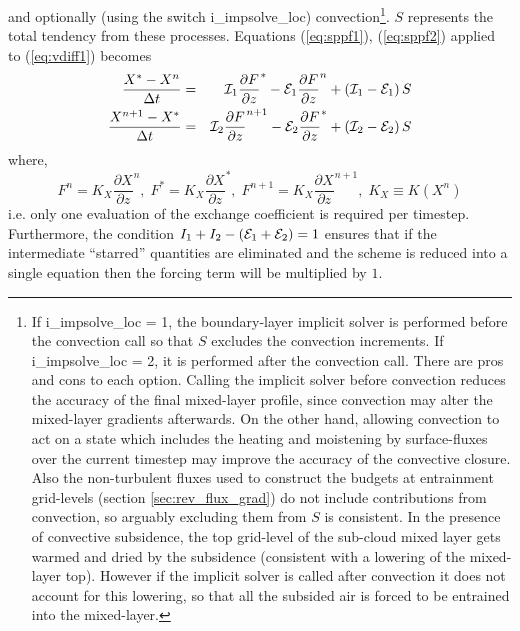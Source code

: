 \documentclass{UMDP_article}
\begin{document}
and optionally (using the switch i\_impsolve\_loc) convection\footnote{If 
i\_impsolve\_loc = 1, the boundary-layer implicit solver is
performed before the convection call so that $S$ excludes the convection
increments.  If i\_impsolve\_loc = 2, it is performed after the convection
call.  There are pros and cons to each option.  Calling the implicit solver
before convection reduces the accuracy of the final mixed-layer profile,
since convection may alter the mixed-layer gradients afterwards.
On the other hand, allowing convection to act on a state which includes
the heating and moistening by surface-fluxes over the current timestep
may improve the accuracy of the convective closure.
Also the non-turbulent fluxes used to construct the budgets at entrainment
grid-levels (section \ref{sec:rev_flux_grad}) do not include contributions
from convection, so arguably excluding them from $S$ is consistent.
In the presence of convective subsidence, the top grid-level of the
sub-cloud mixed layer gets warmed and dried by the subsidence
(consistent with a lowering of the mixed-layer top).  However if the
implicit solver is called after convection it does not account for this
lowering, so that all the subsided air is forced to be entrained into the
mixed-layer.}.  $S$ represents the total tendency from these processes.
Equations (\ref{eq:sppf1}), (\ref{eq:sppf2}) applied to
(\ref{eq:vdiff1}) becomes
\begin{eqnarray}
  \frac{X^{*}-X^{n}}{\Delta t} & = & {\cal I}_{1}\frac{\partial F}{\partial z}^{*}-{\cal E}_{1}\frac{\partial F}{\partial z}^{n}+\left({\cal I}_{1}-{\cal E}_{1}\right)S\label{eq:sppf_bl1}\\
  \frac{X^{n+1}-X^{*}}{\Delta t} & = & {\cal I}_{2}\frac{\partial
    F}{\partial z}^{n+1}-{\cal E}_{2}\frac{\partial F}{\partial
    z}^{*}+\left({\cal I}_{2}-{\cal E}_{2}\right)S\label{eq:sppf_bl2}
\end{eqnarray}
where,
\begin{equation*}
  F^{n}=K_{X}\frac{\partial X}{\partial z}^{n},\;
  F^{*}=K_{X}\frac{\partial X}{\partial z}^{*},\;
  F^{n+1}=K_{X}\frac{\partial X}{\partial z}^{n+1},\; K_{X}\equiv
  K(X^{n})
\end{equation*}
i.e. only one evaluation of the exchange coefficient is
required per timestep. Furthermore, the condition
$I_{1}+I_{2}-({\cal E}_{1}+{\cal E}_{2})=1$ ensures that if the intermediate
``starred'' quantities are eliminated and the scheme is reduced into a
single equation then the forcing term will be multiplied by $1$.
\end{document}
